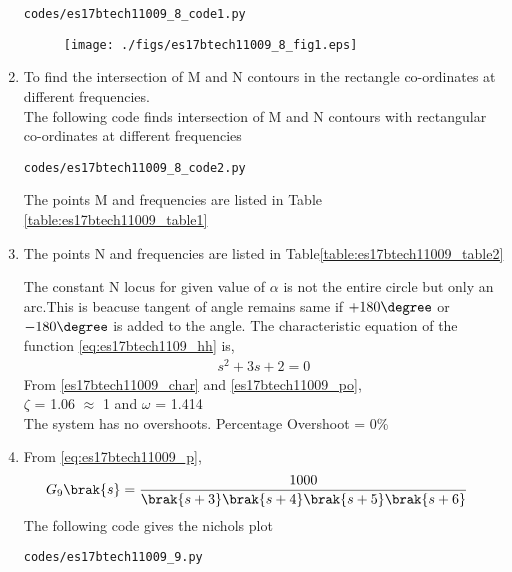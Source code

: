\begin{enumerate}[label=\thesection.\arabic*.,ref=\thesection.\theenumi]
\begin{lstlisting}
codes/es17btech11009_8_code1.py
\end{lstlisting}
\begin{figure}[!h]
\texttt{[image: ./figs/es17btech11009\_8\_fig1.eps]}
\caption{}
\label{fig:es17btech11009_8_1}
\end{figure}
\item
To find the intersection of M and N contours in the rectangle co-ordinates at different frequencies. \\
\solution 
The following code finds intersection of M and N contours with rectangular co-ordinates at different frequencies
\begin{lstlisting}
codes/es17btech11009_8_code2.py
\end{lstlisting}
The points M and frequencies are listed in Table  \ref{table:es17btech11009_table1}
\begin{table}[!ht]
\centering

\caption{}
\label{table:es17btech11009_table1}
\end{table}
\item
The points N and frequencies are listed in Table\ref{table:es17btech11009_table2}
\begin{table}[!ht]
\centering

\caption{}
\label{table:es17btech11009_table2}
\end{table}
The constant N locus for given value of $\alpha$ is not the entire circle but only an arc.This is beacuse tangent of angle remains same if $+180\degree$ or 
$-180\degree$ is added to the angle.
The characteristic equation of the function \eqref{eq:es17btech1109_hh} is,
\begin{align}
 s^2 + 3s + 2 = 0
 \end{align}
From \eqref{es17btech11009_char} and \eqref{es17btech11009_po},
\\
  $\zeta$ = 1.06 $\approx$ 1 and $\omega$ = 1.414
  \\
  The system has no overshoots.
  Percentage Overshoot = 0\%
\item
From \eqref{eq:es17btech11009_p},
\begin{align}
G_9\brak{s} &=\frac{1000}{\brak{s+3}\brak{s+4}\brak{s+5}\brak{s+6}}
\label{eq:es17btech11009_ii}
\end{align}
\solution 
The following code gives the nichols plot
\begin{lstlisting}
codes/es17btech11009_9.py
\end{lstlisting}

\end{enumerate}
